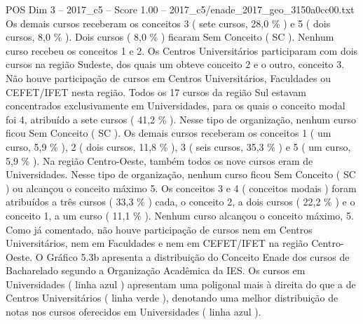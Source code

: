 \begin{textsample}{POS Dim 3 – 2017\_c5 – Score 1.00 – 2017\_c5/enade\_2017\_geo\_3150a0cc00.txt}
Os demais cursos receberam os conceitos 3 ( sete cursos, 28,0 \% ) e 5 ( dois cursos, 8,0 \% ).
Dois cursos ( 8,0 \% ) ficaram Sem Conceito ( SC ).
Nenhum curso recebeu os conceitos 1 e 2.
Os Centros Universitários participaram com dois cursos na região Sudeste, dos quais um obteve conceito 2 e o outro, conceito 3.
Não houve participação de cursos em Centros Universitários, Faculdades ou CEFET/IFET nesta região.
Todos os 17 cursos da região Sul estavam concentrados exclusivamente em Universidades, para os quais o conceito modal foi 4, atribuído a sete cursos ( 41,2 \% ).
Nesse tipo de organização, nenhum curso ficou Sem Conceito ( SC ).
Os demais cursos receberam os conceitos 1 ( um curso, 5,9 \% ), 2 ( dois cursos, 11,8 \% ), 3 ( seis cursos, 35,3 \% ) e 5 ( um curso, 5,9 \% ).
Na região Centro-Oeste, também todos os nove cursos eram de Universidades.
Nesse tipo de organização, nenhum curso ficou Sem Conceito ( SC ) ou alcançou o conceito máximo 5.
Os conceitos 3 e 4 ( conceitos modais ) foram atribuídos a três cursos ( 33,3 \% ) cada, o conceito 2, a dois cursos ( 22,2 \% ) e o conceito 1, a um curso ( 11,1 \% ).
Nenhum curso alcançou o conceito máximo, 5.
Como já comentado, não houve participação de cursos nem em Centros Universitários, nem em Faculdades e nem em CEFET/IFET na região Centro-Oeste.
O Gráfico 5.3b apresenta a distribuição do Conceito Enade dos cursos de Bacharelado segundo a Organização Acadêmica da IES.
Os cursos em Universidades ( linha azul ) apresentam uma poligonal mais à direita do que a de Centros Universitários ( linha verde ), denotando uma melhor distribuição de notas nos cursos oferecidos em Universidades ( linha azul ).

\end{textsample}
